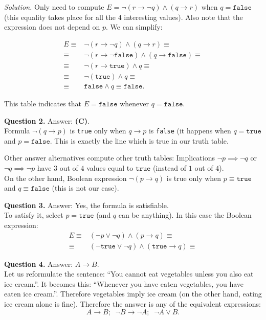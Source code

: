 \documentclass[jou]{apa6}
\begin{document}
{\em Solution.} Only need to compute $E = \neg(r \rightarrow \neg q) \wedge (q \rightarrow r)$
when $q = \mathtt{false}$ (this equality takes place for all the $4$ interesting values). Also 
note that the expression does not depend on $p$. We can simplify:

\begin{align}
E \equiv & \neg(r \rightarrow \neg q) \wedge (q \rightarrow r) \equiv \nonumber \\
  \equiv & \neg(r \rightarrow \neg \mathtt{false}) \wedge (q \rightarrow \mathtt{false}) \equiv \nonumber \\
  \equiv & \neg(r \rightarrow \mathtt{true}) \wedge q \equiv \nonumber \\
  \equiv & \neg(\mathtt{true}) \wedge q \equiv \nonumber \\
  \equiv & \mathtt{false} \wedge q \equiv \mathtt{false}.
\end{align}


This table indicates that $E = \mathtt{false}$ whenever $q = \mathtt{false}$. 

\vspace{10pt}
\noindent
{\bf Question 2.} Answer: {\bf (C)}.\\
Formula $\neg(q \rightarrow p)$ is {\tt true} only when $q \rightarrow p$ is 
{\tt false} (it happens when $q = \mathtt{true}$ and $p = \mathtt{false}$. This is
exactly the line which is true in our truth table.

Other answer alternatives compute other truth tables: Implications $\neg p \implies \neg q$ 
or $\neg q \implies \neg p$ have $3$ out of $4$ values equal to $\mathtt{true}$ (instead of $1$ out of $4$).\\
On the other hand, Boolean expression $\neg(p \rightarrow q)$ is true only when 
$p \equiv \mathtt{true}$ and $q \equiv \mathtt{false}$ (this is not our case).


\vspace{10pt}
\noindent
{\bf Question 3.} Answer: Yes, the formula is satisfiable.\\
To satisfy it, select $p = \mathtt{true}$ (and $q$ can be anything). 
In this case the Boolean expression:
\begin{align}
E \equiv & (\neg p \vee \neg q) \wedge (p \rightarrow q) \equiv \nonumber \\
  \equiv & (\neg \mathtt{true} \vee \neg q) \wedge (\mathtt{true} \rightarrow q) \equiv \nonumber
\end{align}

\vspace{10pt}
\noindent
{\bf Question 4.} Answer: $A \rightarrow B$.\\
Let us reformulate the sentence: ``You cannot eat vegetables unless you also 
eat ice cream.''. It becomes this: ``Whenever you have eaten vegetables, you 
have eaten ice cream.''. Therefore vegetables imply ice cream (on the other hand, 
eating ice cream alone is fine). Therefore the answer is any of the equivalent expressions:
$$A \rightarrow B;\;\;\neg{}B \rightarrow \neg{}A;\;\;\neg{}A \vee B.$$
\end{document}
